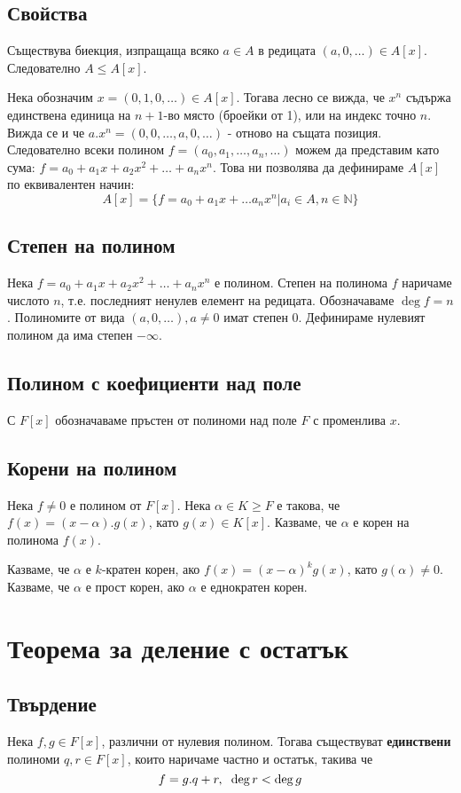 \documentclass[fleqn,12pt]{article}
\begin{document}
\subsection{Свойства}
Съществува биекция, изпращаща всяко $a \in A$ в редицата $(a, 0, \dots) \in A[x]$.
Следователно $A \leq A[x]$.

Нека обозначим $x = (0, 1, 0, \dots) \in A[x]$. Тогава лесно се вижда, че
$x^n$ съдържа единствена единица на $n+1$-во място (броейки от 1), или на индекс точно $n$.
Вижда се и че $a.x^n = (0, 0, \dots, a, 0, \dots)$ - отново на същата позиция.
Следователно всеки полином $f = (a_0, a_1, \dots, a_n, \dots)$ можем да представим като сума:
$f = a_0 + a_1 x + a_2 x^2 + \dots + a_n x^n$.
Това ни позволява да дефинираме $A[x]$ по еквивалентен начин:
\[A[x] = \{ f = a_0 + a_1 x + \dots a_n x^n | a_i \in A, n \in \mathbb{N} \}\]

\subsection{Степен на полином}
Нека $f = a_0 + a_1 x + a_2 x^2 + \dots + a_n x^n$ е полином. Степен на полинома $f$ 
наричаме числото $n$, т.е. последният ненулев елемент на редицата. Обозначаваме $\deg f = n$.
Полиномите от вида $(a, 0, \dots), a \neq 0$ имат степен 0. Дефинираме нулевият полином да има степен $-\infty$.

\subsection{Полином с коефициенти над поле}
С $F[x]$ обозначаваме пръстен от полиноми над поле $F$ с променлива $x$.

\subsection{Корени на полином}
Нека $f \neq 0$ е полином от $F[x]$. Нека $\alpha \in K \geq F$ е такова, че 
$f(x) = (x - \alpha) . g(x)$, като $g(x) \in K[x]$. Казваме, че $\alpha$ е
корен на полинома $f(x)$.

Казваме, че $\alpha$ е $k$-кратен корен, ако $f(x) = (x - \alpha)^k g(x)$, като $g(\alpha) \neq 0$.
Казваме, че $\alpha$ е прост корен, ако $\alpha$ е еднократен корен.

\section{Теорема за деление с остатък}
\label{sec:division}
\subsection{Твърдение}
Нека $f,g \in F[x]$, различни от нулевия полином. 
Тогава съществуват \textbf{единствени} полиноми $q,r \in F[x]$,
които наричаме частно и остатък, такива че
\[ f = g.q + r, \hspace{2mm} \deg r < \deg g \]
\end{document}
